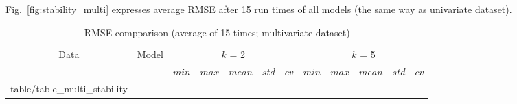 \documentclass[smallcondensed, natbib]{svjour3}     %
\makeatletter
\newcommand\primitiveinput[1]
		{\@@input #1 }
\makeatother
\begin{document}
{Fig.~\ref{fig:stability_multi} expresses average RMSE after 15 run times of all models (the same way as univariate dataset).

\begin{table}[h]
	\caption{RMSE compparison (average of 15 times; multivariate dataset)}
	\label{table:multi_stability}
	\centering
	\begin{adjustbox}{width=\textwidth}
		\begin{tabular}{| c | c| c | c | c | c | c | c | c | c | c | c |}%
		\hline
			 \multirow{2}{*}{Data} & \multirow{2}{*}{Model} & \multicolumn{5}{c|}{$k$ = 2} & \multicolumn{5}{c|}{ $k$ = 5 } \\ 
			 \cline{3-12}
	   		& & $min$ & $max$ & $mean$ & $std$ & $cv$ &   $min$ & $max$ & $mean$ & $std$ & $cv$ \\ [0.5ex] 
		\hline
			\primitiveinput{table/table_multi_stability}
		\hline
		\end{tabular}
	\end{adjustbox}
\end{table}


}
\end{document}
